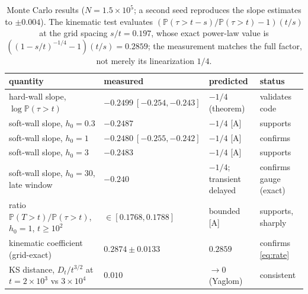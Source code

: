\documentclass[11pt]{article}
\theoremstyle{definition}
\theoremstyle{remark}
\newcommand{\PP}{\mathbb{P}}
\begin{document}
\begin{table}[h]\centering\small
\begin{tabular}{@{}llll@{}}
\toprule
quantity & measured & predicted & status\\
\midrule
hard-wall slope, $\log\PP(\tau>t)$ & $-0.2499\ [-0.254,-0.243]$ &
$-1/4$ (theorem) & validates code\\
soft-wall slope, $h_0=0.3$ & $-0.2487$ & $-1/4$ [A] & supports\\
soft-wall slope, $h_0=1$ & $-0.2480\ [-0.255,-0.242]$ & $-1/4$ [A] &
confirms\\
soft-wall slope, $h_0=3$ & $-0.2483$ & $-1/4$ [A] & supports\\
soft-wall slope, $h_0=30$, late window & $-0.240$ & $-1/4$;
transient delayed & confirms gauge (exact)\\
ratio $\PP(T>t)/\PP(\tau>t)$, $h_0=1$, $t\ge10^2$ &
$\in[0.1768,0.1788]$ & bounded [A] & supports, sharply\\
kinematic coefficient (grid-exact) & $0.2874\pm0.0133$ & $0.2859$ &
confirms \eqref{eq:rate}\\
KS distance, $D_t/t^{3/2}$ at $t=2\times10^3$ vs $3\times10^4$ &
$0.010$ & $\to0$ (Yaglom) & consistent\\
\bottomrule
\end{tabular}
\caption{\small Monte Carlo results ($N=1.5\times10^5$; a second seed
reproduces the slope estimates to $\pm0.004$). The kinematic test
evaluates $(\PP(\tau>t{-}s)/\PP(\tau>t)-1)(t/s)$ at the grid spacing
$s/t=0.197$, whose exact power-law value is
$((1{-}s/t)^{-1/4}{-}1)(t/s)=0.2859$; the measurement matches the full
factor, not merely its linearization $1/4$.}
\label{tab:numerics}
\end{table}
\end{document}

